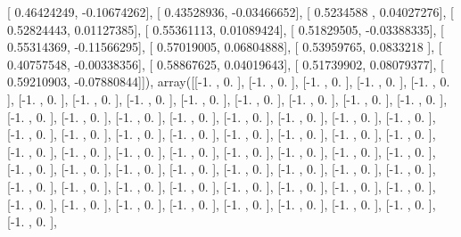 \documentclass{article}
\begin{document}
       [ 0.46424249, -0.10674262],
       [ 0.43528936, -0.03466652],
       [ 0.5234588 ,  0.04027276],
       [ 0.52824443,  0.01127385],
       [ 0.55361113,  0.01089424],
       [ 0.51829505, -0.03388335],
       [ 0.55314369, -0.11566295],
       [ 0.57019005,  0.06804888],
       [ 0.53959765,  0.0833218 ],
       [ 0.40757548, -0.00338356],
       [ 0.58867625,  0.04019643],
       [ 0.51739902,  0.08079377],
       [ 0.59210903, -0.07880844]]), array([[-1.        ,  0.        ],
       [-1.        ,  0.        ],
       [-1.        ,  0.        ],
       [-1.        ,  0.        ],
       [-1.        ,  0.        ],
       [-1.        ,  0.        ],
       [-1.        ,  0.        ],
       [-1.        ,  0.        ],
       [-1.        ,  0.        ],
       [-1.        ,  0.        ],
       [-1.        ,  0.        ],
       [-1.        ,  0.        ],
       [-1.        ,  0.        ],
       [-1.        ,  0.        ],
       [-1.        ,  0.        ],
       [-1.        ,  0.        ],
       [-1.        ,  0.        ],
       [-1.        ,  0.        ],
       [-1.        ,  0.        ],
       [-1.        ,  0.        ],
       [-1.        ,  0.        ],
       [-1.        ,  0.        ],
       [-1.        ,  0.        ],
       [-1.        ,  0.        ],
       [-1.        ,  0.        ],
       [-1.        ,  0.        ],
       [-1.        ,  0.        ],
       [-1.        ,  0.        ],
       [-1.        ,  0.        ],
       [-1.        ,  0.        ],
       [-1.        ,  0.        ],
       [-1.        ,  0.        ],
       [-1.        ,  0.        ],
       [-1.        ,  0.        ],
       [-1.        ,  0.        ],
       [-1.        ,  0.        ],
       [-1.        ,  0.        ],
       [-1.        ,  0.        ],
       [-1.        ,  0.        ],
       [-1.        ,  0.        ],
       [-1.        ,  0.        ],
       [-1.        ,  0.        ],
       [-1.        ,  0.        ],
       [-1.        ,  0.        ],
       [-1.        ,  0.        ],
       [-1.        ,  0.        ],
       [-1.        ,  0.        ],
       [-1.        ,  0.        ],
       [-1.        ,  0.        ],
       [-1.        ,  0.        ],
       [-1.        ,  0.        ],
       [-1.        ,  0.        ],
       [-1.        ,  0.        ],
       [-1.        ,  0.        ],
       [-1.        ,  0.        ],
       [-1.        ,  0.        ],
       [-1.        ,  0.        ],
       [-1.        ,  0.        ],
       [-1.        ,  0.        ],
       [-1.        ,  0.        ],
       [-1.        ,  0.        ],
       [-1.        ,  0.        ],
\end{document}
